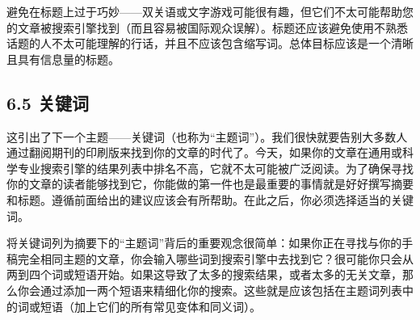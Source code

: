 避免在标题上过于巧妙——双关语或文字游戏可能很有趣，但它们不太可能帮助您的文章被搜索引擎找到（而且容易被国际观众误解）。标题还应该避免使用不熟悉话题的人不太可能理解的行话，并且不应该包含缩写词。总体目标应该是一个清晰且具有信息量的标题。

\subsection*{6.5 关键词}
这引出了下一个主题——关键词（也称为“主题词”）。我们很快就要告别大多数人通过翻阅期刊的印刷版来找到你的文章的时代了。今天，如果你的文章在通用或科学专业搜索引擎的结果列表中排名不高，它就不太可能被广泛阅读。为了确保寻找你的文章的读者能够找到它，你能做的第一件也是最重要的事情就是好好撰写摘要和标题。遵循前面给出的建议应该会有所帮助。在此之后，你必须选择适当的关键词。

将关键词列为摘要下的“主题词”背后的重要观念很简单：如果你正在寻找与你的手稿完全相同主题的文章，你会输入哪些词到搜索引擎中去找到它？很可能你只会从两到四个词或短语开始。如果这导致了太多的搜索结果，或者太多的无关文章，那么你会通过添加一两个短语来精细化你的搜索。这些就是应该包括在主题词列表中的词或短语（加上它们的所有常见变体和同义词）。

